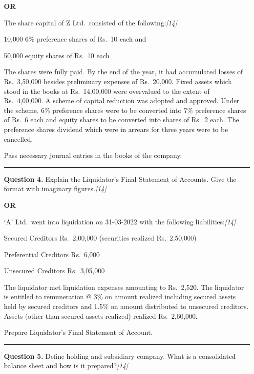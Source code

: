\documentclass[11pt,a4paper]{article}
\newcommand{\pts}[1]{\hfill   \textit{[#1]}}
\begin{document}
\centerline{   \textbf{OR}}

The share capital of Z Ltd.\ consisted of the following:\pts{14}

\begin{parts}
  \item 10,000 6\% preference shares of Rs.\ 10 each and
  \item 50,000 equity shares of Rs.\ 10 each
\end{parts}
The shares were fully paid. By the end of the year, it had accumulated losses of Rs.\ 3,50,000 besides preliminary expenses of Rs.\ 20,000. Fixed assets which stood in the books at Rs.\ 14,00,000 were overvalued to the extent of Rs.\ 4,00,000. A scheme of capital reduction was adopted and approved. Under the scheme, 6\% preference shares were to be converted into 7\% preference shares of Rs.\ 6 each and equity shares to be converted into shares of Rs.\ 2 each. The preference shares dividend which were in arrears for three years were to be cancelled.

Pass necessary journal entries in the books of the company.

\medskip\rule{\linewidth}{0.2pt}




\noindent   \textbf{Question 4.}
Explain the Liquidator's Final Statement of Accounts. Give the format with imaginary figures.\pts{14}

\centerline{   \textbf{OR}}

`A' Ltd.\ went into liquidation on 31-03-2022 with the following liabilities:\pts{14}

\begin{parts}
  \item Secured Creditors Rs.\ 2,00,000 (securities realized Rs.\ 2,50,000)
  \item Preferential Creditors Rs.\ 6,000
  \item Unsecured Creditors Rs.\ 3,05,000
\end{parts}
The liquidator met liquidation expenses amounting to Rs.\ 2,520. The liquidator is entitled to remuneration @ 3\% on amount realized including secured assets held by secured creditors and 1.5\% on amount distributed to unsecured creditors. Assets (other than secured assets realized) realized Rs.\ 2,60,000.

Prepare Liquidator's Final Statement of Account.

\medskip\rule{\linewidth}{0.2pt}




\noindent   \textbf{Question 5.}
Define holding and subsidiary company. What is a consolidated balance sheet and how is it prepared?\pts{14}
\end{document}
